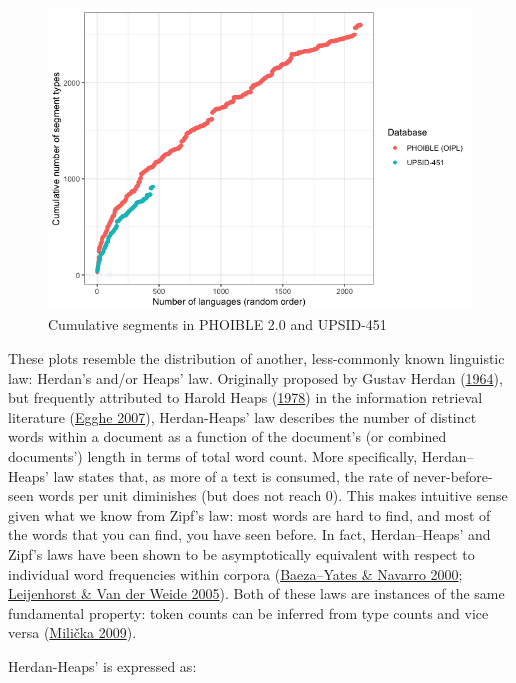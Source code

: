 \documentclass[
]{article}
\begin{document}
\begin{figure}

{\centering \includegraphics[width=0.8\linewidth]{README_files/figure-gfm/cumulative_plot_phoible_upsid-1} 

}

\caption{Cumulative segments in PHOIBLE 2.0 and UPSID-451}\label{fig:phoible_upsid}
\end{figure}

These plots resemble the distribution of another, less-commonly known
linguistic law: Herdan's and/or Heaps' law. Originally proposed by
Gustav Herdan (\protect\hyperlink{ref-Herdan1964}{1964}), but frequently
attributed to Harold Heaps (\protect\hyperlink{ref-Heaps1978}{1978}) in
the information retrieval literature
(\protect\hyperlink{ref-Egghe2007}{Egghe 2007}), Herdan-Heaps' law
describes the number of distinct words within a document as a function
of the document's (or combined documents') length in terms of total word
count. More specifically, Herdan--Heaps' law states that, as more of a
text is consumed, the rate of never-before-seen words per unit
diminishes (but does not reach 0). This makes intuitive sense given what
we know from Zipf's law: most words are hard to find, and most of the
words that you can find, you have seen before. In fact, Herdan--Heaps'
and Zipf's laws have been shown to be asymptotically equivalent with
respect to individual word frequencies within corpora
(\protect\hyperlink{ref-BaezaNavarro2000}{Baeza--Yates \& Navarro 2000};
\protect\hyperlink{ref-vanLeijenhorst2005}{Leijenhorst \& Van der Weide
2005}). Both of these laws are instances of the same fundamental
property: token counts can be inferred from type counts and vice versa
(\protect\hyperlink{ref-Milivcka2009}{Milička 2009}).

Herdan-Heaps' is expressed as:
\end{document}
